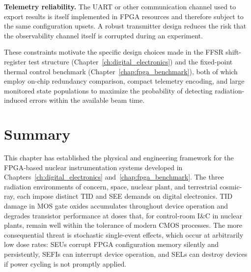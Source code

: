\textbf{Telemetry reliability.}  The UART or other communication
channel used to export results is itself implemented in FPGA resources
and therefore subject to the same configuration upsets.  A robust
transmitter design reduces the risk that the observability channel
itself is corrupted during an experiment.

These constraints motivate the specific design choices made in the
FFSR shift-register test structure (Chapter~\ref{ch:digital_electronics})
and the fixed-point thermal control benchmark
(Chapter~\ref{chap:fpga_benchmark}), both of which employ on-chip
redundancy comparison, compact telemetry encoding, and large monitored
state populations to maximize the probability of detecting
radiation-induced errors within the available beam time.

\section{Summary}

This chapter has established the physical and engineering framework
for the FPGA-based nuclear instrumentation systems developed in
Chapters~\ref{ch:digital_electronics} and~\ref{chap:fpga_benchmark}.  The three radiation environments
of concern, space, nuclear plant, and terrestrial cosmic-ray,
each impose distinct TID and SEE demands on digital electronics.
TID damage in MOS gate oxides accumulates throughout device
operation and degrades transistor performance at doses that,
for control-room I\&C in nuclear plants, remain well within the
tolerance of modern CMOS processes.  The more consequential
threat is stochastic single-event effects, which occur at
arbitrarily low dose rates: SEUs corrupt FPGA configuration
memory silently and persistently, SEFIs can interrupt device
operation, and SELs can destroy devices if power cycling is not
promptly applied.

